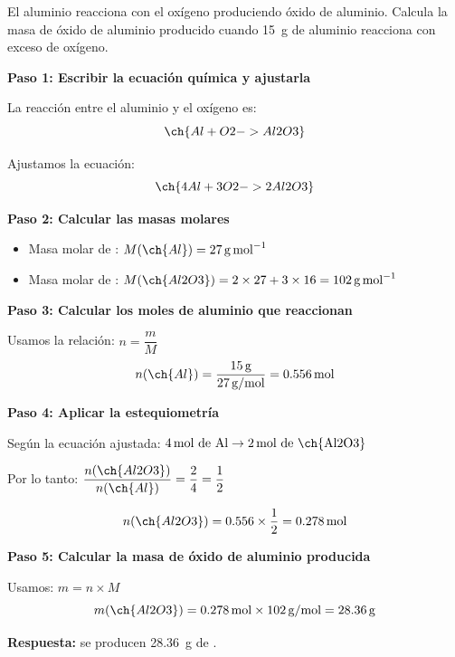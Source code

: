 \begin{exercise}
    El aluminio reacciona con el oxígeno produciendo óxido de aluminio.
    Calcula la masa de óxido de aluminio producido cuando \qty{15}{\g} de aluminio reacciona con exceso de oxígeno.
    \begin{solu}
        \textbf{Paso 1: Escribir la ecuación química y ajustarla}

        La reacción entre el aluminio y el oxígeno es:
        \begin{equation*}
            \ch{Al + O2 -> Al2O3}
        \end{equation*}

        Ajustamos la ecuación:
        \begin{equation*}
            \ch{4 Al + 3 O2 -> 2 Al2O3}
        \end{equation*}

        \textbf{Paso 2: Calcular las masas molares}

        \begin{itemize}
            \item Masa molar de : $M(\ch{Al}) = \qty{27}{\g\per\mol}$
            \item Masa molar de : $M(\ch{Al2O3}) = 2 \times 27 + 3 \times 16 = \qty{102}{\g\per\mol}$
        \end{itemize}

        \textbf{Paso 3: Calcular los moles de aluminio que reaccionan}

        Usamos la relación: $n = \dfrac{m}{M}$
        \begin{equation*}
            n(\ch{Al}) = \frac{15\,\text{g}}{27\,\text{g/mol}} = 0.556\,\text{mol}
        \end{equation*}

        \textbf{Paso 4: Aplicar la estequiometría}

        Según la ecuación ajustada: $4\,\text{mol de Al} \rightarrow 2\,\text{mol de \ch{Al2O3}}$

        Por lo tanto: $\dfrac{n(\ch{Al2O3})}{n(\ch{Al})} = \dfrac{2}{4} = \dfrac{1}{2}$

        \begin{equation*}
            n(\ch{Al2O3}) = 0.556 \times \frac{1}{2} = 0.278\,\text{mol}
        \end{equation*}

        \textbf{Paso 5: Calcular la masa de óxido de aluminio producida}

        Usamos: $m = n \times M$
        \begin{equation*}
            m(\ch{Al2O3}) = 0.278\,\text{mol} \times 102\,\text{g/mol} = \qty{28.36}{\g}
        \end{equation*}

        \textbf{Respuesta:} se producen \qty{28.36}{\g} de .
    \end{solu}
\end{exercise}

